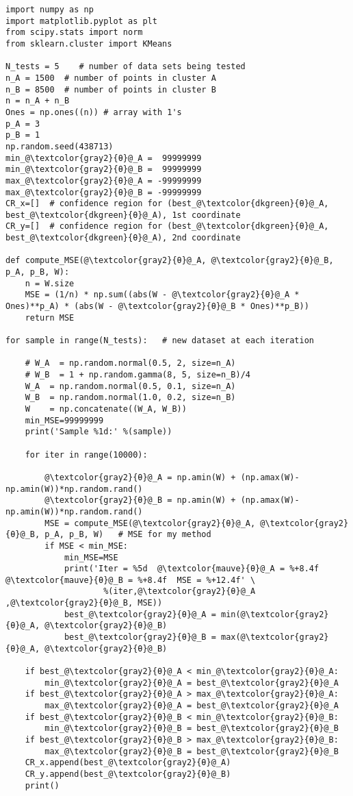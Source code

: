 \documentclass[oneside,10pt]{book}
\begin{document}
\begin{lstlisting}[escapechar=@]
import numpy as np
import matplotlib.pyplot as plt
from scipy.stats import norm
from sklearn.cluster import KMeans

N_tests = 5    # number of data sets being tested
n_A = 1500  # number of points in cluster A
n_B = 8500  # number of points in cluster B
n = n_A + n_B
Ones = np.ones((n)) # array with 1's
p_A = 3
p_B = 1
np.random.seed(438713)
min_@\textcolor{gray2}{θ}@_A =  99999999
min_@\textcolor{gray2}{θ}@_B =  99999999
max_@\textcolor{gray2}{θ}@_A = -99999999
max_@\textcolor{gray2}{θ}@_B = -99999999
CR_x=[]  # confidence region for (best_@\textcolor{dkgreen}{θ}@_A, best_@\textcolor{dkgreen}{θ}@_A), 1st coordinate
CR_y=[]  # confidence region for (best_@\textcolor{dkgreen}{θ}@_A, best_@\textcolor{dkgreen}{θ}@_A), 2nd coordinate

def compute_MSE(@\textcolor{gray2}{θ}@_A, @\textcolor{gray2}{θ}@_B, p_A, p_B, W):
    n = W.size
    MSE = (1/n) * np.sum((abs(W - @\textcolor{gray2}{θ}@_A * Ones)**p_A) * (abs(W - @\textcolor{gray2}{θ}@_B * Ones)**p_B))
    return MSE

for sample in range(N_tests):   # new dataset at each iteration

    # W_A  = np.random.normal(0.5, 2, size=n_A)
    # W_B  = 1 + np.random.gamma(8, 5, size=n_B)/4
    W_A  = np.random.normal(0.5, 0.1, size=n_A)
    W_B  = np.random.normal(1.0, 0.2, size=n_B)
    W    = np.concatenate((W_A, W_B))
    min_MSE=99999999
    print('Sample %1d:' %(sample))

    for iter in range(10000):

        @\textcolor{gray2}{θ}@_A = np.amin(W) + (np.amax(W)-np.amin(W))*np.random.rand()
        @\textcolor{gray2}{θ}@_B = np.amin(W) + (np.amax(W)-np.amin(W))*np.random.rand()
        MSE = compute_MSE(@\textcolor{gray2}{θ}@_A, @\textcolor{gray2}{θ}@_B, p_A, p_B, W)   # MSE for my method
        if MSE < min_MSE:
            min_MSE=MSE
            print('Iter = %5d  @\textcolor{mauve}{θ}@_A = %+8.4f  @\textcolor{mauve}{θ}@_B = %+8.4f  MSE = %+12.4f' \
                    %(iter,@\textcolor{gray2}{θ}@_A ,@\textcolor{gray2}{θ}@_B, MSE))
            best_@\textcolor{gray2}{θ}@_A = min(@\textcolor{gray2}{θ}@_A, @\textcolor{gray2}{θ}@_B)
            best_@\textcolor{gray2}{θ}@_B = max(@\textcolor{gray2}{θ}@_A, @\textcolor{gray2}{θ}@_B)

    if best_@\textcolor{gray2}{θ}@_A < min_@\textcolor{gray2}{θ}@_A:
        min_@\textcolor{gray2}{θ}@_A = best_@\textcolor{gray2}{θ}@_A
    if best_@\textcolor{gray2}{θ}@_A > max_@\textcolor{gray2}{θ}@_A:
        max_@\textcolor{gray2}{θ}@_A = best_@\textcolor{gray2}{θ}@_A
    if best_@\textcolor{gray2}{θ}@_B < min_@\textcolor{gray2}{θ}@_B:
        min_@\textcolor{gray2}{θ}@_B = best_@\textcolor{gray2}{θ}@_B
    if best_@\textcolor{gray2}{θ}@_B > max_@\textcolor{gray2}{θ}@_B:
        max_@\textcolor{gray2}{θ}@_B = best_@\textcolor{gray2}{θ}@_B
    CR_x.append(best_@\textcolor{gray2}{θ}@_A)
    CR_y.append(best_@\textcolor{gray2}{θ}@_B)
    print()


\end{lstlisting}
\end{document}
